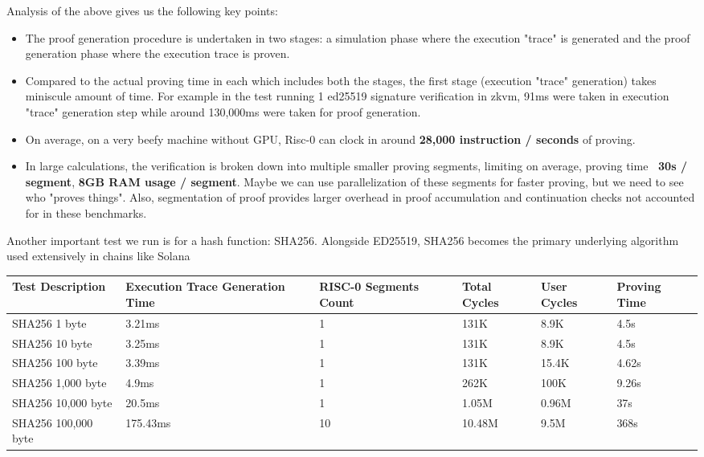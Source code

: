 Analysis of the above gives us the following key points:
\begin{itemize}
    \item The proof generation procedure is undertaken in two stages: a simulation phase where the execution "trace" is generated and the proof generation phase where the execution trace is proven.
    \item Compared to the actual proving time in each which includes both the stages, the first stage (execution "trace" generation) takes miniscule amount of time. For example in the test running 1 ed25519 signature verification in zkvm, 91ms were taken in execution "trace" generation step while around 130,000ms were taken for proof generation.
    \item On average, on a very beefy machine without GPU, Risc-0 can clock in around \textbf{28,000 instruction / seconds} of proving.
    \item In large calculations, the verification is broken down into multiple smaller proving segments, limiting on average, proving time \textbf{~30s / segment}, \textbf{8GB RAM usage / segment}. Maybe we can use parallelization of these segments for faster proving, but we need to see who "proves things". Also, segmentation of proof provides larger overhead in proof accumulation and continuation checks not accounted for in these benchmarks.
\end{itemize}

Another important test we run is for a hash function: SHA256. Alongside ED25519, SHA256 becomes the primary underlying algorithm used extensively in chains like Solana

\begin{center}
\begin{tabular}{ | m{14em} | m{5em}| m{5em} |m{5em} |m{5em} |m{4em} | } 
  \hline
  \textbf{Test Description} & \textbf{Execution Trace Generation Time} & \textbf{RISC-0 Segments Count} & \textbf{Total Cycles} & \textbf{User Cycles} & \textbf{Proving Time}\\ 
  \hline
  SHA256 1 byte  & 3.21ms & 1 & 131K & 8.9K & 4.5s \\ 
  \hline
  SHA256 10 byte  & 3.25ms & 1 & 131K & 8.9K & 4.5s \\ 
  \hline
  SHA256 100 byte  & 3.39ms & 1 & 131K & 15.4K & 4.62s \\ 
  \hline
  SHA256 1,000 byte  & 4.9ms & 1 & 262K & 100K & 9.26s \\ 
  \hline
  SHA256 10,000 byte  & 20.5ms & 1 & 1.05M & 0.96M & 37s \\ 
  \hline
  SHA256 100,000 byte  & 175.43ms & 10 & 10.48M & 9.5M & 368s \\ 
  \hline
\end{tabular}
\end{center}

